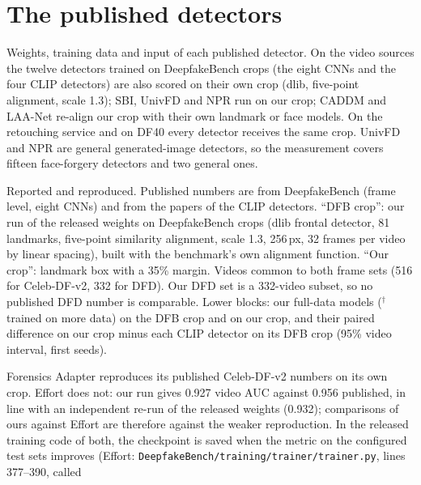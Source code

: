 \documentclass[10pt]{article}
\begin{document}
\section{The published detectors}
\label{sec:baselines}
\begin{table}[H]
\centering
\caption{Weights, training data and input of each published detector. On the video sources the twelve detectors trained on
DeepfakeBench crops (the eight CNNs and the four CLIP detectors) are also scored on their own crop (dlib, five-point alignment, scale 1.3); SBI,
UnivFD and NPR run on our crop; CADDM and LAA-Net re-align our crop with their own landmark or face models. On the retouching
service and on DF40 every detector receives the same crop. UnivFD and NPR are general generated-image detectors, so the
measurement covers fifteen face-forgery detectors and two general ones.}
\label{tab:baselines}
\footnotesize

\end{table}
\begin{table}[H]
\centering
\caption{Reported and reproduced. Published numbers are from DeepfakeBench (frame level, eight CNNs) and from the papers of the
CLIP detectors. ``DFB crop'': our run of the released weights on DeepfakeBench crops (dlib frontal detector, 81 landmarks,
five-point similarity alignment, scale 1.3, 256\,px, 32 frames per video by linear spacing), built with the benchmark's own
alignment function. ``Our crop'': landmark box with a 35\% margin. Videos common to both frame sets (516 for Celeb-DF-v2, 332 for
DFD). Our DFD set is a 332-video subset, so no published DFD number is comparable. Lower blocks: our full-data models
($^\dagger$trained on more data) on the DFB crop and on our crop, and their paired difference on our crop minus each CLIP
detector on its DFB crop (95\% video interval, first seeds).}
\label{tab:reproduce}
\footnotesize
\begin{adjustbox}{max width=\linewidth}\end{adjustbox}
\end{table}
Forensics Adapter reproduces its published Celeb-DF-v2 numbers on its own crop. Effort does not: our run gives 0.927 video AUC
against 0.956 published, in line with an independent re-run of the released weights (0.932); comparisons of ours against
Effort are therefore against the weaker reproduction. In the released training code of both, the checkpoint is saved when the
metric on the configured test sets improves (Effort: \texttt{DeepfakeBench/training/trainer/trainer.py}, lines 377--390, called
\end{document}
